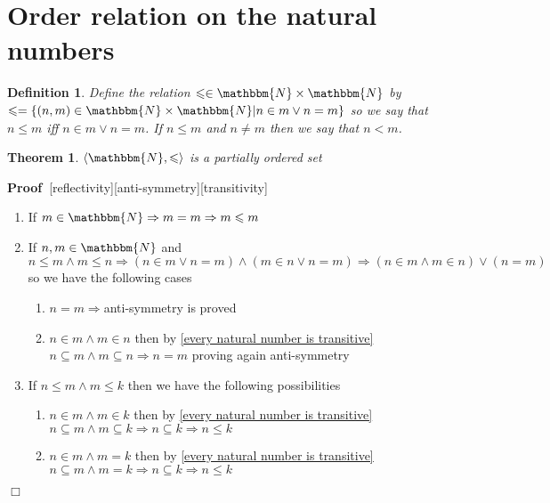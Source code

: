 \documentclass{book}
\newcommand{\nobracket}{}
\newenvironment{proof}{\noindent\textbf{Proof\ }}{\hspace*{\fill}$\Box$\medskip}
\newtheorem{definition}{Definition}
{\theorembodyfont{\rmfamily}\newtheorem{example}{Example}}
\newtheorem{theorem}{Theorem}
\begin{document}
{{\section{Order relation on the natural numbers}

\begin{definition}
  Define the relation $\leqslant \in \mathbbm{N} \times \mathbbm{N}$ by
  $\leqslant = \{ (n, m) \in \mathbbm{N} \times \mathbbm{N} | n \in m \vee n =
  m \nobracket \}$ so we say that $n \leqslant m$ iff $n \in m \vee n = m$. If
  $n \leqslant m$ and $n \neq m$ then we say that $n < m$.
\end{definition}

\begin{theorem}
  $\label{natural numbers are partially ordered} \langle \mathbbm{N},
  \leqslant \rangle$ is a partially ordered set
\end{theorem}

\begin{proof}[reflectivity][anti-symmetry][transitivity]
  
  \begin{enumerate}
    \item If $m \in \mathbbm{N} \Rightarrow m = m \Rightarrow m \leqslant m$
    
    \item If $n, m \in \mathbbm{N}$ and $n \leqslant m \wedge m \leqslant n
    \Rightarrow (n \in m \vee n = m) \wedge (m \in n \vee n = m) \Rightarrow
    (n \in m \wedge m \in n) \vee (n = m)$ so we have the following cases
    \begin{enumerate}
      \item $n = m \Rightarrow$anti-symmetry is proved
      
      \item $n \in m \wedge m \in n$ then by \ref{every natural number is
      transitive} $n \subseteq m \wedge m \subseteq n \Rightarrow n = m$
      proving again anti-symmetry
    \end{enumerate}
    \item If $n \leqslant m \wedge m \leqslant k$ then we have the following
    possibilities
    \begin{enumerate}
      \item $n \in m \wedge m \in k$ then by \ref{every natural number is
      transitive} $n \subseteq m \wedge m \subseteq k \Rightarrow n \subseteq
      k \Rightarrow n \leqslant k$
      
      \item $n \in m \wedge m = k$ then by \ref{every natural number is
      transitive} $n \subseteq m \wedge m = k \Rightarrow n \subseteq k
      \Rightarrow n \leqslant k$
      

\end{enumerate}
\end{enumerate}
\end{proof}}}
\end{document}
